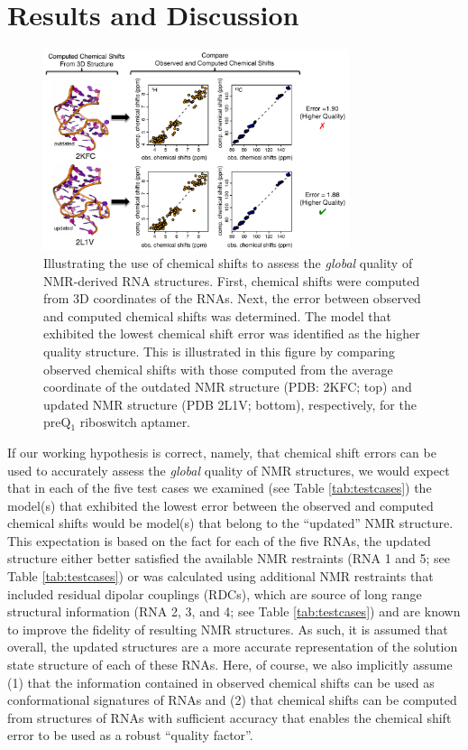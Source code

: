 \documentclass[fleqn,10pt]{wlscirep}
\begin{document}
\section*{Results and Discussion}
\begin{figure}[h]
\begin{center}
\includegraphics[width=0.8\textwidth]{figure_illustrate}
\end{center}
\caption{Illustrating the use of chemical shifts to assess the \textit{global} quality of NMR-derived RNA structures. First, chemical shifts were computed from 3D coordinates of the RNAs. Next, the error between observed and computed chemical shifts was determined. The model that exhibited the lowest chemical shift error was identified as the higher quality structure. This is illustrated in this figure by comparing observed chemical shifts with those computed from the average coordinate of the outdated NMR structure (PDB: 2KFC; top) and updated NMR structure (PDB 2L1V; bottom), respectively, for the preQ$_{1}$ riboswitch aptamer.}
\label{fig:illustrate}
\end{figure}

If our working hypothesis is correct, namely, that chemical shift errors can be used to accurately assess the \textit{global} quality of NMR structures, we would expect that in each of the five test cases we examined (see Table \ref{tab:testcases}) the model(s) that exhibited the lowest error between the observed and computed chemical shifts would be model(s) that belong to the ``updated'' NMR structure. This expectation is based on the fact for each of the five RNAs, the updated structure either better satisfied the available NMR restraints (RNA 1 and 5; see Table \ref{tab:testcases}) or was calculated using additional NMR restraints that included residual dipolar couplings (RDCs), which are source of long range structural information (RNA 2, 3, and 4; see Table \ref{tab:testcases}) and are known to improve the fidelity of resulting NMR structures. As such, it is assumed that overall, the updated structures are a more accurate representation of the solution state structure of each of these RNAs. Here, of course, we also implicitly assume (1) that the information contained in observed chemical shifts can be used as conformational signatures of RNAs and (2) that chemical shifts can be computed from structures of RNAs with sufficient accuracy that enables the chemical shift error to be used as a robust ``quality factor''.
\end{document}
